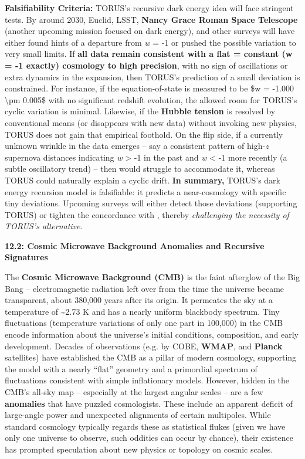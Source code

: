 \documentclass[
]{article}
\begin{document}
\textbf{Falsifiability Criteria:} TORUS's recursive dark energy idea
will face stringent tests. By around 2030, Euclid, LSST, \textbf{Nancy
Grace Roman Space Telescope} (another upcoming mission focused on dark
energy), and other surveys will have either found hints of a departure
from \emph{w} = -1 or pushed the possible variation to very small
limits. If \textbf{all data remain consistent with a flat \Lambda = constant
(w = -1 exactly) cosmology to high precision}, with no sign of
oscillations or extra dynamics in the expansion, then TORUS's prediction
of a small deviation is constrained. For instance, if the
equation-of-state is measured to be \$w = -1.000 \textbackslash pm
0.005\$ with no significant redshift evolution, the allowed room for
TORUS's cyclic variation is minimal. Likewise, if the \textbf{Hubble
tension} is resolved by conventional means (or disappears with new data)
without invoking new physics, TORUS does not gain that empirical
foothold. On the flip side, if a currently unknown wrinkle in the data
emerges -- say a consistent pattern of high-\emph{z} supernova distances
indicating \emph{w} \textgreater{} -1 in the past and \emph{w}
\textless{} -1 more recently (a subtle oscillatory trend) -- then \LambdaCDM
would struggle to accommodate it, whereas TORUS could naturally explain
a cyclic drift. \textbf{In summary,} TORUS's dark energy recursion model
is falsifiable: it predicts a near-\LambdaCDM cosmology with specific tiny
deviations. Upcoming surveys will either detect those deviations
(supporting TORUS) or tighten the concordance with \LambdaCDM, thereby
\emph{challenging the necessity of TORUS's alternative}\hspace{0pt}.

\textbf{12.2: Cosmic Microwave Background Anomalies and Recursive
Signatures}

The \textbf{Cosmic Microwave Background (CMB)} is the faint afterglow of
the Big Bang -- electromagnetic radiation left over from the time the
universe became transparent, about 380,000 years after its origin. It
permeates the sky at a temperature of \textasciitilde2.73 K and has a
nearly uniform blackbody spectrum. Tiny fluctuations (temperature
variations of only one part in 100,000) in the CMB encode information
about the universe's initial conditions, composition, and early
development. Decades of observations (e.g. by COBE, \textbf{WMAP}, and
\textbf{Planck} satellites) have established the CMB as a pillar of
modern cosmology, supporting the \LambdaCDM model with a nearly ``flat''
geometry and a primordial spectrum of fluctuations consistent with
simple inflationary models. However, hidden in the CMB's all-sky map --
especially at the largest angular scales -- are a few \textbf{anomalies}
that have puzzled cosmologists. These include an apparent deficit of
large-angle power and unexpected alignments of certain multipoles. While
standard cosmology typically regards these as statistical flukes (given
we have only one universe to observe, such oddities can occur by
chance), their existence has prompted speculation about new physics or
topology on cosmic scales.
\end{document}
